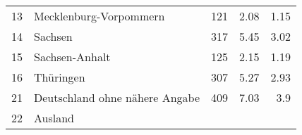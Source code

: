\begin{longtable}{lXrrr}
     13 &
     \multicolumn{1}{X}{ Mecklenburg-Vorpommern   } &


       \num{121} &
       \num[round-mode=places,round-precision=2]{2.08} &
         \num[round-mode=places,round-precision=2]{1.15} \\

     14 &
     \multicolumn{1}{X}{ Sachsen   } &


       \num{317} &
       \num[round-mode=places,round-precision=2]{5.45} &
         \num[round-mode=places,round-precision=2]{3.02} \\

     15 &
     \multicolumn{1}{X}{ Sachsen-Anhalt   } &


       \num{125} &
       \num[round-mode=places,round-precision=2]{2.15} &
         \num[round-mode=places,round-precision=2]{1.19} \\

     16 &
     \multicolumn{1}{X}{ Thüringen   } &


       \num{307} &
       \num[round-mode=places,round-precision=2]{5.27} &
         \num[round-mode=places,round-precision=2]{2.93} \\

     21 &
     \multicolumn{1}{X}{ Deutschland ohne nähere Angabe   } &


       \num{409} &
       \num[round-mode=places,round-precision=2]{7.03} &
         \num[round-mode=places,round-precision=2]{3.9} \\

     22 &
     \multicolumn{1}{X}{ Ausland   } &



\end{longtable}
